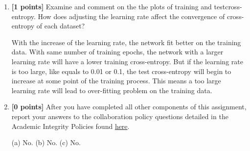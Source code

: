 \documentclass[11pt]{article}
\numberwithin{equation}{section} %
\numberwithin{figure}{section} %
\numberwithin{table}{section} %
\newcommand{\ntset}{test}
\newcommand{\points}[1]{{\bf [#1 points]}}
\begin{document}
\begin{enumerate}
 \begin{tcolorbox}[fit,height=18cm, width=15cm, blank, borderline={1pt}{-2pt}]
    \end{tcolorbox}




\clearpage
\item \points{1} 
Examine and comment on the the plots of training and \ntset\thinspace cross-entropy. How does adjusting the learning rate affect the convergence of cross-entropy of each dataset?

 \begin{tcolorbox}[fit,height=10cm, width=15cm, blank, borderline={1pt}{-2pt}]
    With the increase of the learning rate, the network fit better on the training data. With same number of training epochs, the network with a larger learning rate will have a lower training cross-entropy. But if the learning rate is too large, like equals to 0.01 or 0.1, the test cross-entropy will begin to increase at some point of the training process. This means a too large learning rate will lead to over-fitting problem on the training data.
    \end{tcolorbox}


\item \points{0} After you have completed all other components of this assignment, report your answers to the collaboration policy questions detailed in the Academic Integrity Policies found \href{http://www.cs.cmu.edu/~mgormley/courses/10601bd-f18/about.html#7-academic-integrity-policies}{here}.

\begin{tcolorbox}[fit,height=8cm, width=15cm, blank, borderline={1pt}{-2pt}]
    (a) No. (b) No. (c) No. 
    \end{tcolorbox}

\end{enumerate}


\clearpage

%
%
\end{document}

